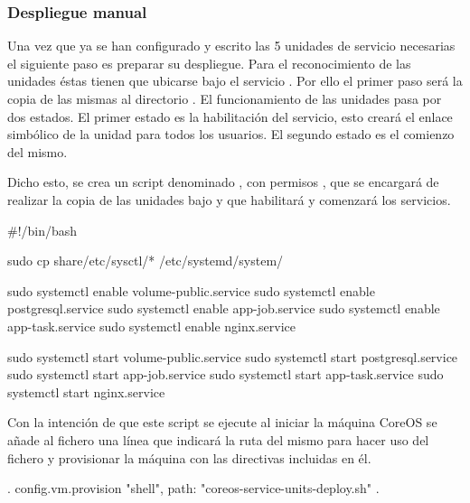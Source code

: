\subsubsection{Despliegue manual}

Una vez que ya se han configurado y escrito las 5 unidades de servicio necesarias el siguiente paso es preparar su despliegue. Para el reconocimiento de las unidades éstas tienen que ubicarse bajo el servicio . Por ello el primer paso será la copia de las mismas al directorio . El funcionamiento de las unidades pasa por dos estados. El primer estado es la habilitación del servicio, esto creará el enlace simbólico de la unidad para todos los usuarios. El segundo estado es el comienzo del mismo.

Dicho esto, se crea un script denominado , con permisos , que se encargará de realizar la copia de las unidades bajo  y que habilitará y comenzará los servicios.

\begin{codelisting}
\label{code:coreos-service-units-deploy}
\begin{code}
#!/bin/bash

sudo cp share/etc/sysctl/* /etc/systemd/system/

sudo systemctl enable volume-public.service
sudo systemctl enable postgresql.service
sudo systemctl enable app-job.service
sudo systemctl enable app-task.service
sudo systemctl enable nginx.service

sudo systemctl start volume-public.service
sudo systemctl start postgresql.service
sudo systemctl start app-job.service
sudo systemctl start app-task.service
sudo systemctl start nginx.service
\end{code}
\end{codelisting}

Con la intención de que este script se ejecute al iniciar la máquina CoreOS se añade al fichero  una línea que indicará la ruta del mismo para hacer uso del fichero y provisionar la máquina con las directivas incluidas en él.

\begin{codelisting}
\label{code:vagrantfile3}
\begin{code}
.
config.vm.provision "shell", path: "coreos-service-units-deploy.sh"
.
\end{code}
\end{codelisting}

